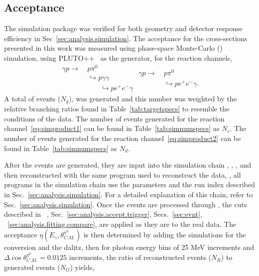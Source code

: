 \subsection{Acceptance}\label{sec:results.acceptance}

The simulation package was verified for both geometry and detector response efficiency in Sec~\ref{sec:analysis.simulation}. The acceptance for the cross-sections presented in this work was measured using phase-space Monte-Carlo (\label{abbr:mc}) simulation, using PLUTO++~\cite{PLUTO} as the generator, for the reaction channels,
\begin{subequations}
	\begin{align}
		\gamma p \rightarrow & \ p \pi^{0} \nonumber \\[-0.4em]
		& \ \hookrightarrow p \gamma \gamma \nonumber \\[-0.4em]
		& \qquad \hookrightarrow p e^+ e^- \gamma
		\label{eq:simproduct1}
		\end{align}
		\begin{align}
		\gamma p \rightarrow & \ p \pi^{0} \nonumber \\[-0.4em]
		& \ \hookrightarrow p e^+ e^- \gamma.
		\label{eq:simproduct2}
		\end{align}
\end{subequations} 
A total of events ($N_g$), was generated and this number was weighted by the relative branching ratios found in Table~\ref{tab:targetspecs} to resemble the conditions of the data. The number of events generated for the reaction channel~\ref{eq:simproduct1} can be found in Table~\ref{tab:simnumspecs} as $N_c$. The number of events generated for the reaction channel~\ref{eq:simproduct2} can be found in Table~\ref{tab:simnumspecs} as $N_d$.

After the events are generated, they are input into the  simulation chain \label{abbr:gamp2bos}, \label{abbr:gsim}, \label{abbr:gpp}, and then reconstructed with the same program used to reconstruct the data, \label{abbr:a1c}, all programs in the simulation chain use the parameters and the run index described in Sec.~\ref{sec:analysis.simulation}. For a detailed explanation of this chain, refer to Sec.~\ref{sec:analysis.simulation}. Once the events are processed through , the cuts described in ~\cite{g12note}, Sec.~\ref{sec:analysis.accept.trigger},  Secs.~\ref{sec:evnt}, ~\ref{sec:analysis.fitting.compare}, are applied as they are to the real data. The acceptance $\eta(E_\gamma,\theta^{\pi^0}_{C.M.})$ is then determined by adding the simulations for the conversion and the dalitz, then for photon energy bins of 25 MeV increments and $\Delta\cos\theta^{\pi^0}_{C.M.} = 0.0125$ increments, the ratio of reconstructed events ($N_R$) to generated events ($N_G$) yields,
